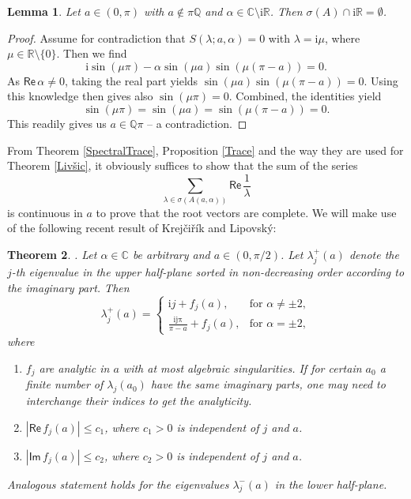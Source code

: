 \documentclass[11pt, a4paper,reqno]{amsart}
\theoremstyle{plain}
\newtheorem{theorem}{{Theorem}}[section]
\newtheorem{lemma}[theorem]{Lemma}
\theoremstyle{definition}
\theoremstyle{remark}
\renewcommand{\leq}{\leqslant}	\renewcommand{\geq}{\geqslant}
\newcommand{\1}{\mathds 1}
\renewcommand{\Re}{\mathsf{Re}\,}
\renewcommand{\Im}{\mathsf{Im}\,}
\begin{document}
\begin{lemma}\label{L: No harmonic modes}
    Let $a \in (0,\pi)$ with $a \notin \pi\mathbb Q$ and $\alpha \in \mathbb C \setminus \mathrm{i}\mathbb R$. Then $\sigma(A) \cap \mathrm{i}\mathbb R = \emptyset$.
\end{lemma}
\begin{proof}
   Assume for contradiction that $S(\lambda;a,\alpha) = 0$ with $\lambda = \mathrm{i}\mu$, where $\mu \in \mathbb R \setminus \{0\}$. Then we find
   \[
   \mathrm{i}\sin(\mu\pi) - \alpha\sin(\mu a)\sin(\mu(\pi-a)) = 0.
   \]
   As $\Re \alpha \neq 0$, taking the real part yields $\sin(\mu a)\sin(\mu(\pi-a)) = 0$. Using this knowledge then gives also $\sin(\mu \pi) = 0$. Combined, the identities yield 
    \[\sin(\mu \pi) = \sin(\mu a) = \sin(\mu(\pi-a)) = 0.
    \]
    This readily gives us $a \in \mathbb Q \pi$ -- a contradiction.
\end{proof}


From Theorem \ref{SpectralTrace}, Proposition \ref{Trace} and the way they are used for Theorem \ref{Livšic}, it obviously suffices to show that the sum of the series
\[
\sum_{\lambda \in \sigma(A(a, \alpha))} \Re\frac{1}{\lambda}
\]
is continuous in $a$ to prove that the root vectors are complete. We will make use of the following recent result of Krejčiřík and Lipovský:
\begin{theorem} \cite[Theorem 4.2]{KrLip}. \label{BoundednessOfEigenvalues} Let $\alpha \in \mathbb C$ be arbitrary and $a \in (0, \pi/2)$. Let $\lambda_j^+(a)$ denote the $j$-th eigenvalue in the upper half-plane sorted in non-decreasing order according to the imaginary part. Then
\[
\lambda_j^+(a) = \begin{cases}
    \mathrm{i}j + f_j(a), & \text{for } \alpha \neq \pm 2, \\
    \frac{\mathrm{ij\pi}}{\pi-a} + f_j(a), & \text{for } \alpha = \pm 2,
\end{cases}
\]
where
\begin{enumerate}
    \item $f_j$ are analytic in $a$ with at most algebraic singularities. If for certain $a_0$ a finite number of $\lambda_j(a_0)$ have the same imaginary parts, one may need to interchange their indices to get the analyticity.
    \item $|\Re f_j(a)| \leq c_1$, where $c_1 > 0$ is independent of $j$ and $a$.
    \item $|\Im f_j(a)| \leq c_2$, where $c_2 > 0$ is independent of $j$ and $a$.
\end{enumerate}
Analogous statement holds for the eigenvalues $\lambda_j^-(a)$ in the lower half-plane.    
\end{theorem}
\end{document}
